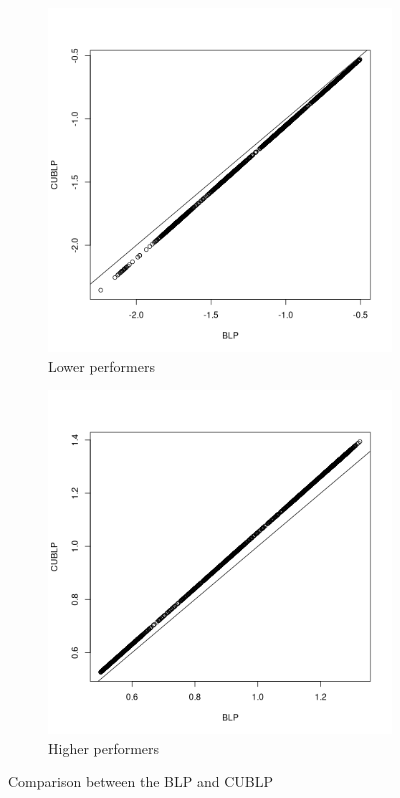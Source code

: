\documentclass[man, floatsintext]{apa7}
\begin{document}
  \begin{figure}[t]
    \centering
    \begin{subfigure}[b]{0.45\textwidth}
      \centering
      \includegraphics[width=\textwidth]{fig/lower_S.png}
      \caption{Lower performers}
    \end{subfigure}
    \begin{subfigure}[b]{0.45\textwidth}
      \centering
      \includegraphics[width=\textwidth]{fig/higher_S.png}
      \caption{Higher performers}
    \end{subfigure}
    \caption{Comparison between the BLP and CUBLP}
    \label{fig:comp_real_data}
  \end{figure}
\end{document}

